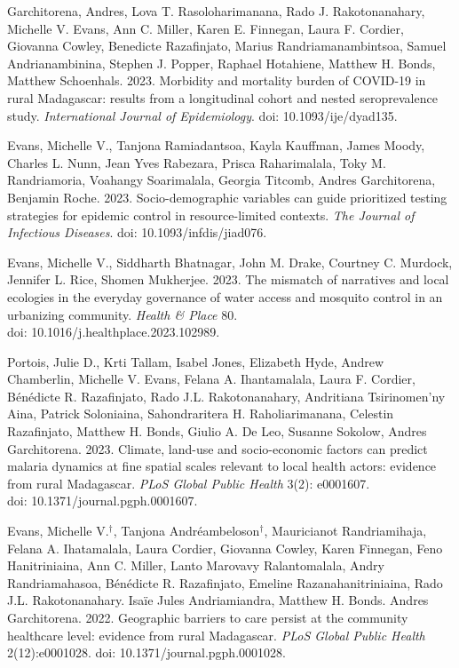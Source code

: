 \begin{etaremune}
\item Garchitorena, Andres, Lova T. Rasoloharimanana, Rado J. Rakotonanahary, \textcolor{awesome}{Michelle V. Evans}, Ann C. Miller, Karen E. Finnegan, Laura F. Cordier, Giovanna Cowley, Benedicte Razafinjato, Marius Randriamanambintsoa, Samuel Andrianambinina, Stephen J. Popper, Raphael Hotahiene, Matthew H. Bonds, Matthew Schoenhals. 2023. Morbidity and mortality burden of COVID-19 in rural Madagascar: results from a longitudinal cohort and nested seroprevalence study. \textit{International Journal of Epidemiology}. doi: 10.1093/ije/dyad135. \smallskip

\item \textcolor{awesome}{Evans, Michelle V.}, Tanjona Ramiadantsoa, Kayla Kauffman, James Moody, Charles L. Nunn, Jean Yves Rabezara, Prisca Raharimalala, Toky M. Randriamoria, Voahangy Soarimalala, Georgia Titcomb, Andres Garchitorena, Benjamin Roche. 2023. Socio-demographic variables can guide prioritized testing strategies for epidemic control in resource-limited contexts. \textit{The Journal of Infectious Diseases}. doi: 10.1093/infdis/jiad076. \smallskip


\item \textcolor{awesome}{Evans, Michelle V.}, Siddharth Bhatnagar, John M. Drake, Courtney C. Murdock, Jennifer L. Rice, Shomen Mukherjee. 2023. The mismatch of narratives and local ecologies in the everyday governance of water access and mosquito control in an urbanizing community. \textit{Health \& Place} 80. \\ doi: 10.1016/j.healthplace.2023.102989. \smallskip

\item Portois, Julie D., Krti Tallam, Isabel Jones, Elizabeth Hyde, Andrew Chamberlin, \textcolor{awesome}{Michelle V. Evans}, Felana A. Ihantamalala, Laura F. Cordier, B\'{e}n\'{e}dicte R. Razafinjato, Rado J.L. Rakotonanahary, Andritiana Tsirinomen'ny Aina, Patrick Soloniaina, Sahondraritera H. Raholiarimanana, Celestin Razafinjato, Matthew H. Bonds, Giulio A. De Leo, Susanne Sokolow, Andres Garchitorena. 2023. Climate, land-use and socio-economic factors can predict malaria dynamics at fine spatial scales relevant to local health actors: evidence from rural Madagascar. \textit{PLoS Global Public Health} 3(2): e0001607. \\ doi: 10.1371/journal.pgph.0001607. \smallskip

\item \textcolor{awesome}{Evans, Michelle V.}$^\dagger$, Tanjona Andr\'{e}ambeloson$^\dagger$, Mauricianot Randriamihaja, Felana A. Ihatamalala, Laura Cordier, Giovanna Cowley, Karen Finnegan, Feno Hanitriniaina, Ann C. Miller, Lanto Marovavy Ralantomalala, Andry Randriamahasoa, B\'{e}n\'{e}dicte R. Razafinjato, Emeline Razanahanitriniaina, Rado J.L. Rakotonanahary. Isa\"{i}e Jules Andriamiandra, Matthew H. Bonds. Andres Garchitorena. 2022. Geographic barriers to care persist at the community healthcare level: evidence from rural Madagascar. \textit{PLoS Global Public Health} 2(12):e0001028. doi: 10.1371/journal.pgph.0001028. \smallskip


\end{etaremune}
